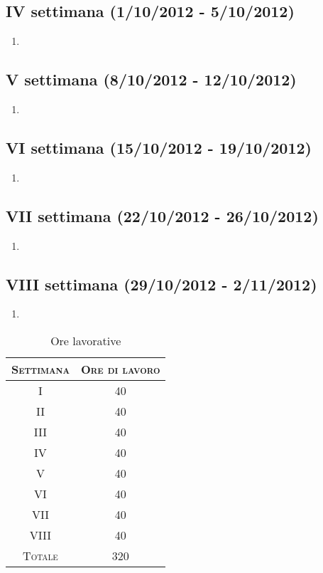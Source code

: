 \documentclass[10pt,a4paper,hidelinks]{scrartcl} %
\begin{document}
	\subsection*{IV settimana (1/10/2012 - 5/10/2012)}
	\begin{enumerate}
	\item {}
	\end{enumerate}
	\subsection*{V settimana (8/10/2012 - 12/10/2012)}
	\begin{enumerate}
	\item {}
	\end{enumerate}	
	\subsection*{VI settimana (15/10/2012 - 19/10/2012)}
	\begin{enumerate}
	\item {}
	\end{enumerate}
	\subsection*{VII settimana (22/10/2012 - 26/10/2012)}
	\begin{enumerate}
	\item {}
	\end{enumerate}
	\subsection*{VIII settimana (29/10/2012 - 2/11/2012)}
	\begin{enumerate}
	\item {}
	\end{enumerate}

	\begin{table}[ht]
	\centering
	\begin{tabular}{|c|c|}
	\hline
	\textsc{Settimana} & \textsc{Ore di lavoro} \\ \hline
	I & 40 \\ \hline
	II & 40 \\ \hline
	III & 40 \\ \hline
	IV & 40 \\ \hline
	V & 40 \\ \hline
	VI & 40 \\ \hline
	VII & 40 \\ \hline
	VIII & 40 \\ \hline
	\textsc{Totale} & 320 \\ \hline
	\end{tabular}
	\caption{Ore lavorative}
	\label{tab:stage:wp:workload}
	\end{table}
\end{document}
